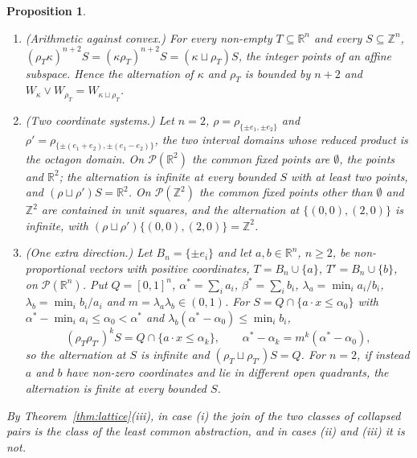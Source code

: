 \documentclass[11pt]{amsart}
\newtheorem{prop}[thm]{Proposition}
\theoremstyle{definition}
\newcommand{\cP}{\mathcal P}
\begin{document}
\begin{prop}\label{prop:numeric}
\begin{enumerate}
\item[(i)] (Arithmetic against convex.) For every non-empty
$T\subseteq\mathbb R^n$ and every $S\subseteq\mathbb Z^n$,
$(\rho_T\kappa)^{n+2}S=(\kappa\rho_T)^{n+2}S=(\kappa\sqcup\rho_T)S$,
the integer points of an affine subspace. Hence the alternation of
$\kappa$ and $\rho_T$ is bounded by $n+2$ and $W_\kappa\vee W_{\rho_T}
=W_{\kappa\sqcup\rho_T}$.
\item[(ii)] (Two coordinate systems.) Let $n=2$, $\rho=\rho_{\{\pm
e_1,\pm e_2\}}$ and $\rho'=\rho_{\{\pm(e_1+e_2),\pm(e_1-e_2)\}}$, the two
interval domains whose reduced product is the octagon domain. On
$\cP(\mathbb R^2)$ the common fixed points are $\emptyset$, the points
and $\mathbb R^2$; the alternation is infinite at every bounded $S$ with
at least two points, and $(\rho\sqcup\rho')S=\mathbb R^2$. On
$\cP(\mathbb Z^2)$ the common fixed points other than $\emptyset$ and
$\mathbb Z^2$ are contained in unit squares, and the alternation at
$\{(0,0),(2,0)\}$ is infinite, with $(\rho\sqcup\rho')\{(0,0),(2,0)\}=
\mathbb Z^2$.
\item[(iii)] (One extra direction.) Let $B_n=\{\pm e_i\}$ and let
$a,b\in\mathbb R^n$, $n\ge2$, be non-proportional vectors with positive
coordinates, $T=B_n\cup\{a\}$, $T'=B_n\cup\{b\}$, on $\cP(\mathbb R^n)$.
Put $Q=[0,1]^n$, $\alpha^*=\sum_ia_i$, $\beta^*=\sum_ib_i$,
$\lambda_a=\min_ia_i/b_i$, $\lambda_b=\min_ib_i/a_i$ and
$m=\lambda_a\lambda_b\in(0,1)$. For $S=Q\cap\{a\cdot x\le\alpha_0\}$ with
$\alpha^*-\min_ia_i\le\alpha_0<\alpha^*$ and $\lambda_b(\alpha^*-\alpha_0)
\le\min_ib_i$,
\[
(\rho_T\rho_{T'})^kS=Q\cap\{a\cdot x\le\alpha_k\},\qquad
\alpha^*-\alpha_k=m^k(\alpha^*-\alpha_0),
\]
so the alternation at $S$ is infinite and $(\rho_T\sqcup\rho_{T'})S=Q$.
For $n=2$, if instead $a$ and $b$ have non-zero coordinates and lie in
different open quadrants, the alternation is finite at every bounded $S$.
\end{enumerate}
By Theorem~\ref{thm:lattice}(iii), in case (i) the join of the two
classes of collapsed pairs is the class of the least common abstraction,
and in cases (ii) and (iii) it is not.
\end{prop}
\end{document}
